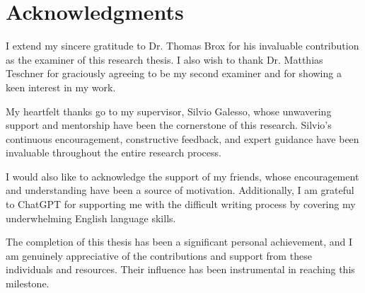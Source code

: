 \chapter{Acknowledgments}
I extend my sincere gratitude to Dr. Thomas Brox for his invaluable contribution as the examiner of this research thesis. I also wish to thank Dr. Matthias Teschner for graciously agreeing to be my second examiner and for showing a keen interest in my work.

My heartfelt thanks go to my supervisor, Silvio Galesso, whose unwavering support and mentorship have been the cornerstone of this research. Silvio's continuous encouragement, constructive feedback, and expert guidance have been invaluable throughout the entire research process.

I would also like to acknowledge the support of my friends, whose encouragement and understanding have been a source of motivation. Additionally, I am grateful to ChatGPT for supporting me with the difficult writing process by covering my underwhelming English language skills.

The completion of this thesis has been a significant personal achievement, and I am genuinely appreciative of the contributions and support from these individuals and resources. Their influence has been instrumental in reaching this milestone.
